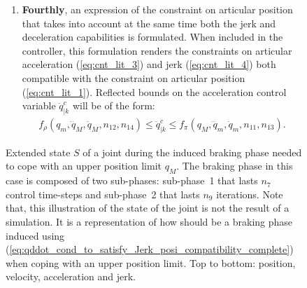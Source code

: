 \begin{figure}[!htbp]
\begin{enumerate}
\begin{equation}
\begin{split}
f_{\mu}(q_m, \dddot{q}_M, \dddot{q}_m, n_8, n_{10}) \leq \ddot{q}_{|k}^{c} \leq f_{\lambda}(q_M, \dddot{q}_m, \dddot{q}_M, n_7, n_9). 
\label{eq:qddot_cond_to_satisfy_Jerk_posi_compatibility_complete}
\end{split}
\end{equation}
The proper methods to compute $n_7$, $n_9$, $n_8$, $n_{10}$, $f_{\lambda}$ and $f_{\mu}$ are fully defined in Section~\ref{subsec:case3}. 
\begin{figure}[!htbp]
{\texttt{[image: /home/anis/Desktop/THESIS\_ANIS/THESIS/figures/Constrcomp/8\_Podfgf12]}}
\caption{Extended state $S$ of a joint during the induced braking phase needed to cope with an upper position limit $q_{M}$. The braking phase in this case is composed of two sub-phases: sub-phase~1 that lasts $n_{7}$ control time-steps and sub-phase~2 that lasts $n_{9}$ iterations. Note that, this illustration of the state of the joint is not the result of a simulation. It is a representation of how should be a braking phase induced using (\ref{eq:qddot_cond_to_satisfy_Jerk_posi_compatibility_complete}) when coping with an upper position limit. Top to bottom: position, velocity, acceleration and jerk.} 
\label{fig:8_Podfgf12}
\end{figure}
\item \textbf{Fourthly}, an expression of the constraint on articular position that takes into account at the same time both the jerk and deceleration capabilities is formulated. When included in the controller, this formulation renders the constraints on articular acceleration (\ref{eq:cnt_lit_3}) and jerk (\ref{eq:cnt_lit_4}) both compatible with the constraint on articular position (\ref{eq:cnt_lit_1}). Reflected bounds on the acceleration control variable $\ddot{q}_{|k}^{c}$ will be of the form: 
\begin{equation}
\begin{split}
f_{\rho}(q_m, \dddot{q}_M, \ddot{q}_M, n_{12}, n_{14}) \leq \ddot{q}_{|k}^{c} \leq f_{\pi}(q_M, \dddot{q}_m, \ddot{q}_m, n_{11}, n_{13}). 

\end{split}
\end{equation}
\end{enumerate}
\end{figure}
